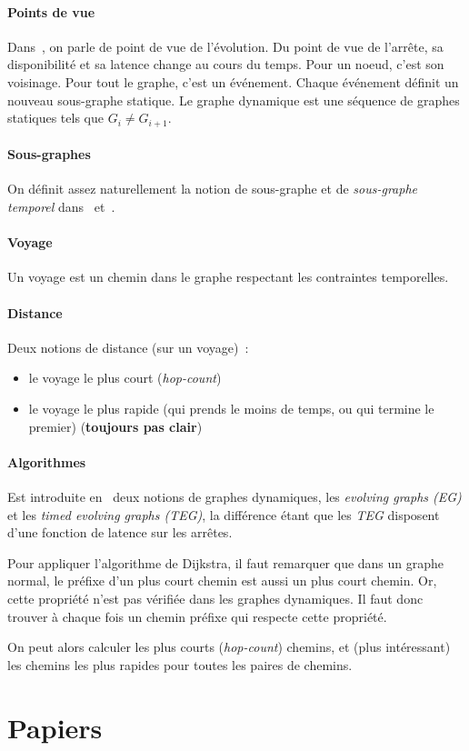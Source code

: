 \documentclass[11pt,a4paper]{article}
\begin{document}
\paragraph{Points de vue}
Dans~\cite{casteigts2012time}, on parle de point de vue de
l'évolution. Du point de vue de l'arrête, sa disponibilité et sa
latence change au cours du temps. Pour un noeud, c'est son voisinage.
Pour tout le graphe, c'est un événement. Chaque événement définit un
nouveau sous-graphe statique. Le graphe dynamique est une séquence de
graphes statiques tels que \(G_i \neq G_{i+1}\).

\paragraph{Sous-graphes}
On définit assez naturellement la notion de sous-graphe et de
\textit{sous-graphe temporel} dans~\cite{casteigts2012time}
et~\cite{latapy2017stream}.

\paragraph{Voyage}
Un voyage est un chemin dans le graphe respectant les contraintes
temporelles.

\paragraph{Distance}
Deux notions de distance (sur un voyage)~:
\begin{itemize}
\item le voyage le plus court (\textit{hop-count})
\item le voyage le plus rapide (qui prends le moins de temps, ou qui
  termine le premier) (\textbf{toujours pas clair})
\end{itemize}

\paragraph{Algorithmes}
Est introduite en~\cite{xuan2003computing} deux notions de graphes
dynamiques, les \textit{evolving graphs (EG)} et les \textit{timed
  evolving graphs (TEG)}, la différence étant que les \textit{TEG}
disposent d'une fonction de latence sur les arrêtes.

Pour appliquer l'algorithme de Dijkstra, il faut remarquer que dans un
graphe normal, le préfixe d'un plus court chemin est aussi un plus
court chemin. Or, cette propriété n'est pas vérifiée dans les graphes
dynamiques. Il faut donc trouver à chaque fois un chemin préfixe qui
respecte cette propriété.

On peut alors calculer les plus courts (\textit{hop-count}) chemins,
et (plus intéressant) les chemins les plus rapides pour toutes les
paires de chemins.

\section{Papiers}



\end{document}
